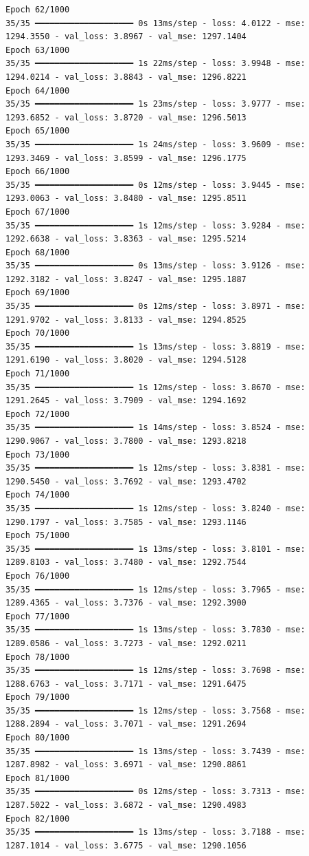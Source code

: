 \documentclass[
  letterpaper,
  DIV=11,
  numbers=noendperiod]{scrreprt}
\begin{document}
\begin{verbatim}
Epoch 62/1000
35/35 ━━━━━━━━━━━━━━━━━━━━ 0s 13ms/step - loss: 4.0122 - mse: 1294.3550 - val_loss: 3.8967 - val_mse: 1297.1404
Epoch 63/1000
35/35 ━━━━━━━━━━━━━━━━━━━━ 1s 22ms/step - loss: 3.9948 - mse: 1294.0214 - val_loss: 3.8843 - val_mse: 1296.8221
Epoch 64/1000
35/35 ━━━━━━━━━━━━━━━━━━━━ 1s 23ms/step - loss: 3.9777 - mse: 1293.6852 - val_loss: 3.8720 - val_mse: 1296.5013
Epoch 65/1000
35/35 ━━━━━━━━━━━━━━━━━━━━ 1s 24ms/step - loss: 3.9609 - mse: 1293.3469 - val_loss: 3.8599 - val_mse: 1296.1775
Epoch 66/1000
35/35 ━━━━━━━━━━━━━━━━━━━━ 0s 12ms/step - loss: 3.9445 - mse: 1293.0063 - val_loss: 3.8480 - val_mse: 1295.8511
Epoch 67/1000
35/35 ━━━━━━━━━━━━━━━━━━━━ 1s 12ms/step - loss: 3.9284 - mse: 1292.6638 - val_loss: 3.8363 - val_mse: 1295.5214
Epoch 68/1000
35/35 ━━━━━━━━━━━━━━━━━━━━ 0s 13ms/step - loss: 3.9126 - mse: 1292.3182 - val_loss: 3.8247 - val_mse: 1295.1887
Epoch 69/1000
35/35 ━━━━━━━━━━━━━━━━━━━━ 0s 12ms/step - loss: 3.8971 - mse: 1291.9702 - val_loss: 3.8133 - val_mse: 1294.8525
Epoch 70/1000
35/35 ━━━━━━━━━━━━━━━━━━━━ 1s 13ms/step - loss: 3.8819 - mse: 1291.6190 - val_loss: 3.8020 - val_mse: 1294.5128
Epoch 71/1000
35/35 ━━━━━━━━━━━━━━━━━━━━ 1s 12ms/step - loss: 3.8670 - mse: 1291.2645 - val_loss: 3.7909 - val_mse: 1294.1692
Epoch 72/1000
35/35 ━━━━━━━━━━━━━━━━━━━━ 1s 14ms/step - loss: 3.8524 - mse: 1290.9067 - val_loss: 3.7800 - val_mse: 1293.8218
Epoch 73/1000
35/35 ━━━━━━━━━━━━━━━━━━━━ 1s 12ms/step - loss: 3.8381 - mse: 1290.5450 - val_loss: 3.7692 - val_mse: 1293.4702
Epoch 74/1000
35/35 ━━━━━━━━━━━━━━━━━━━━ 1s 12ms/step - loss: 3.8240 - mse: 1290.1797 - val_loss: 3.7585 - val_mse: 1293.1146
Epoch 75/1000
35/35 ━━━━━━━━━━━━━━━━━━━━ 1s 13ms/step - loss: 3.8101 - mse: 1289.8103 - val_loss: 3.7480 - val_mse: 1292.7544
Epoch 76/1000
35/35 ━━━━━━━━━━━━━━━━━━━━ 1s 12ms/step - loss: 3.7965 - mse: 1289.4365 - val_loss: 3.7376 - val_mse: 1292.3900
Epoch 77/1000
35/35 ━━━━━━━━━━━━━━━━━━━━ 1s 13ms/step - loss: 3.7830 - mse: 1289.0586 - val_loss: 3.7273 - val_mse: 1292.0211
Epoch 78/1000
35/35 ━━━━━━━━━━━━━━━━━━━━ 1s 12ms/step - loss: 3.7698 - mse: 1288.6763 - val_loss: 3.7171 - val_mse: 1291.6475
Epoch 79/1000
35/35 ━━━━━━━━━━━━━━━━━━━━ 1s 12ms/step - loss: 3.7568 - mse: 1288.2894 - val_loss: 3.7071 - val_mse: 1291.2694
Epoch 80/1000
35/35 ━━━━━━━━━━━━━━━━━━━━ 1s 13ms/step - loss: 3.7439 - mse: 1287.8982 - val_loss: 3.6971 - val_mse: 1290.8861
Epoch 81/1000
35/35 ━━━━━━━━━━━━━━━━━━━━ 0s 12ms/step - loss: 3.7313 - mse: 1287.5022 - val_loss: 3.6872 - val_mse: 1290.4983
Epoch 82/1000
35/35 ━━━━━━━━━━━━━━━━━━━━ 1s 13ms/step - loss: 3.7188 - mse: 1287.1014 - val_loss: 3.6775 - val_mse: 1290.1056

\end{verbatim}
\end{document}
